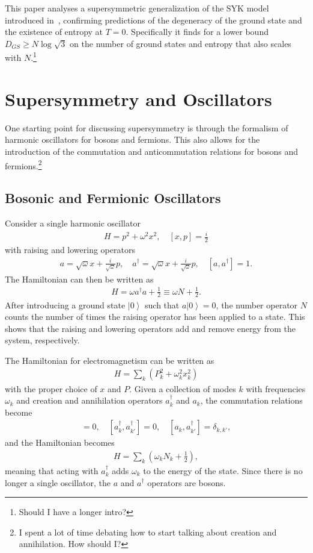\documentclass[12pt]{article} %
\renewcommand{\th}[1]{\frac{1}{#1}}
\newcommand{\om}{\omega}
\newcommand{\ket}[1]{\left|#1\right\rangle}
\newcommand{\comm}[2]{\left[#1,#2\right]}
\begin{document}
This paper analyses a supersymmetric generalization of the SYK model introduced in~\cite{fu16}, confirming predictions of the degeneracy of the ground state and the existence of entropy at $T=0$. Specifically it finds for a lower bound $D_{GS}\ge N\log\sqrt{3}$ on the number of ground states and entropy that also scales with $N$.\footnote{Should I have a longer intro?}



\section{Supersymmetry and Oscillators}

One starting point for discussing supersymmetry is through the formalism of harmonic oscillators for bosons and fermions. This also allows for the introduction of the commutation and anticommutation relations for bosons and fermions.\footnote{I spent a lot of time debating how to start talking about creation and annihilation. How should I?}

\subsection{Bosonic and Fermionic Oscillators} \emph{}

Consider a single harmonic oscillator 
\begin{align}
H = p^2 +\om^2 x^2,\quad \comm{x}{p} = \frac{i}{2} \label{eqn:harmosc}
\end{align}
with raising and lowering operators
\begin{align}
a = \sqrt{\om}x+\frac{i}{\sqrt{\om}}p,\quad a^\dag = \sqrt{\om}x+\frac{i}{
	\sqrt{\om}}p,\quad \comm{a}{a^\dag } = 1.
\end{align}
The Hamiltonian can then be written as 
\begin{align}
H = \om a^\dag a + \th{2} \equiv \om N + \th{2}.
\end{align}
After introducing a ground state $\ket{0}$ such that $a\ket{0} = 0$, the number operator $N$ counts the number of times the raising operator has been applied to a state. This shows that the raising and lowering operators add and remove energy from the system, respectively. 

The Hamiltonian for electromagnetism can be written as
\begin{align}
H = \sum_k \left(P_k^2 + \om_k^2x_k^2\right)
\end{align}
with the proper choice of $x$ and $P$. Given a collection of modes $k$ with frequencies $\om_k$ and creation and annihilation operators $a_k^\dag$ and $a_k$, the commutation relations become 
\begin{align}
[a_k, a_{k'}] = 0,\quad [a^\dag_k, a^\dag_{k'}]=0, \quad[a_k,a^\dag_{k'}] = 
	\delta_{k,k'},
\end{align}
and the Hamiltonian becomes
\begin{align}
H = \sum_k\left(\om_kN_k+\th{2}\right),
\end{align}
meaning that acting with $a_k^\dag$ adds $\om_k$ to the energy of the state. Since there is no longer a single oscillator, the $a$ and $a^\dag$ operators are bosons. 
\end{document}
